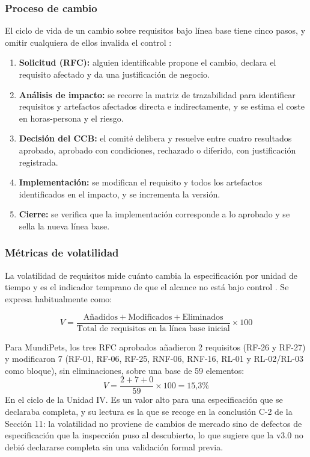 \documentclass[journal,onecolumn]{IEEEtran}
\begin{document}
	\subsubsection{Proceso de cambio}
	
	El ciclo de vida de un cambio sobre requisitos bajo línea base tiene cinco pasos, y omitir cualquiera de ellos invalida el control \cite{pmbok,wiegers}:
	
	\begin{enumerate}
		\item \textbf{Solicitud (RFC):} alguien identificable propone el cambio, declara el requisito afectado y da una justificación de negocio.
		\item \textbf{Análisis de impacto:} se recorre la matriz de trazabilidad para identificar requisitos y artefactos afectados directa e indirectamente, y se estima el coste en horas-persona y el riesgo.
		\item \textbf{Decisión del CCB:} el comité delibera y resuelve entre cuatro resultados aprobado, aprobado con condiciones, rechazado o diferido, con justificación registrada.
		\item \textbf{Implementación:} se modifican el requisito y todos los artefactos identificados en el impacto, y se incrementa la versión.
		\item \textbf{Cierre:} se verifica que la implementación corresponde a lo aprobado y se sella la nueva línea base.
	\end{enumerate}
	
	\subsubsection{Métricas de volatilidad}
	
	La volatilidad de requisitos mide cuánto cambia la especificación por unidad de tiempo y es el indicador temprano de que el alcance no está bajo control \cite{wiegers}. Se expresa habitualmente como:
	
	\[
	V = \frac{\text{Añadidos} + \text{Modificados} + \text{Eliminados}}{\text{Total de requisitos en la línea base inicial}} \times 100
	\]
	
	Para MundiPets, los tres RFC aprobados añadieron 2 requisitos (RF-26 y RF-27) y modificaron 7 (RF-01, RF-06, RF-25, RNF-06, RNF-16, RL-01 y RL-02/RL-03 como bloque), sin eliminaciones, sobre una base de 59 elementos:
	\[
	V = \frac{2 + 7 + 0}{59} \times 100 = 15\text{,}3\%
	\]
	En el ciclo de la Unidad IV. Es un valor alto para una especificación que se declaraba completa, y su lectura es la que se recoge en la conclusión C-2 de la Sección 11: la volatilidad no proviene de cambios de mercado sino de defectos de especificación que la inspección puso al descubierto, lo que sugiere que la v3.0 no debió declararse completa sin una validación formal previa.
	
\end{document}
